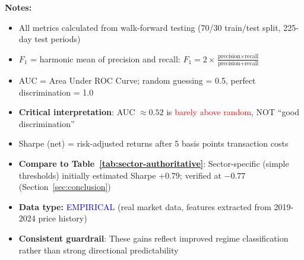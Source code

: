 \begin{table}[H]
\begin{minipage}{\textwidth}
\footnotesize
\textbf{Notes:}
\begin{itemize}[leftmargin=*,noitemsep,topsep=0pt]
    \item All metrics calculated from walk-forward testing (70/30 train/test split, 225-day test periods)
    \item $F_1$ = harmonic mean of precision and recall: $F_1 = 2 \times \frac{\text{precision} \times \text{recall}}{\text{precision} + \text{recall}}$
    \item AUC = Area Under ROC Curve; random guessing = 0.5, perfect discrimination = 1.0
    \item \textbf{Critical interpretation}: AUC $\approx 0.52$ is \textcolor{red}{barely above random}, NOT ``good discrimination''
    \item Sharpe (net) = risk-adjusted returns after 5 basis points transaction costs
    \item \textbf{Compare to Table~\ref{tab:sector-authoritative}}: Sector-specific (simple thresholds) initially estimated Sharpe $+0.79$; verified at $-0.77$ (Section~\ref{sec:conclusion})
    \item \textbf{Data type:} \textcolor{blue}{EMPIRICAL} (real market data, features extracted from 2019-2024 price history)
    \item \textbf{Consistent guardrail}: These gains reflect improved regime classification rather than strong directional predictability
\end{itemize}
\end{minipage}

\end{table}
